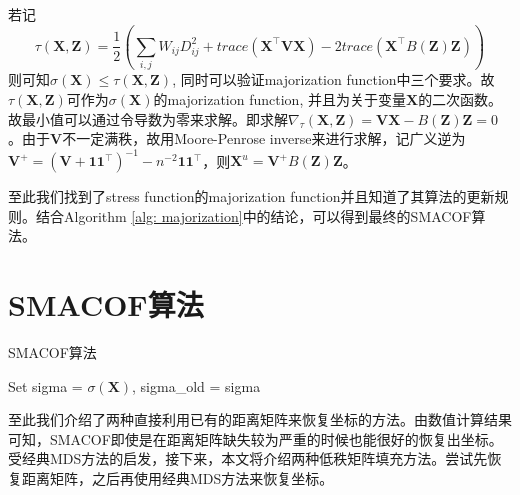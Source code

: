 若记
\begin{equation*}
    \tau(\mathbf{X,Z}) = \frac{1}{2}\left(\sum_{i,j}W_{ij}D_{ij}^2 + trace(\mathbf{X}^\intercal \mathbf{VX}) -2trace(\mathbf{X}^\intercal B(\mathbf{Z})\mathbf{Z})\right)
\end{equation*}
则可知$\sigma(\mathbf{X}) \leq \tau(\mathbf{X,Z})$, 同时可以验证majorization function中三个要求。故$\tau(\mathbf{X,Z})$可作为$\sigma(\mathbf{X})$的majorization function, 并且为关于变量$\mathbf{X}$的二次函数。故最小值可以通过令导数为零来求解。即求解$\nabla_{\tau}(\mathbf{X,Z}) = \mathbf{VX}- B(\mathbf{Z})\mathbf{Z} = 0$。由于$\mathbf{V}$不一定满秩，故用Moore-Penrose inverse来进行求解，记广义逆为$\mathbf{V}^+ = (\mathbf{V} + \mathbf{11}^\intercal)^{-1} - n^{-2}\mathbf{11}^\intercal$，则$\mathbf{X}^u = \mathbf{V}^+B(\mathbf{Z})\mathbf{Z}$。

至此我们找到了stress function的majorization function并且知道了其算法的更新规则。结合Algorithm \ref{alg: majorization}中的结论，可以得到最终的SMACOF算法。


\section{SMACOF算法}
\begin{algorithm}
\caption{SMACOF算法} 
\label{alg: SMACOF}
\begin{algorithmic}[1]
\STATE Set sigma = $\sigma(\mathbf{X})$, sigma\_old = sigma
\ENDWHILE
{}
\end{algorithmic}
\end{algorithm}
至此我们介绍了两种直接利用已有的距离矩阵来恢复坐标的方法。由数值计算结果可知，SMACOF即使是在距离矩阵缺失较为严重的时候也能很好的恢复出坐标。受经典MDS方法的启发，接下来，本文将介绍两种低秩矩阵填充方法。尝试先恢复距离矩阵，之后再使用经典MDS方法来恢复坐标。
